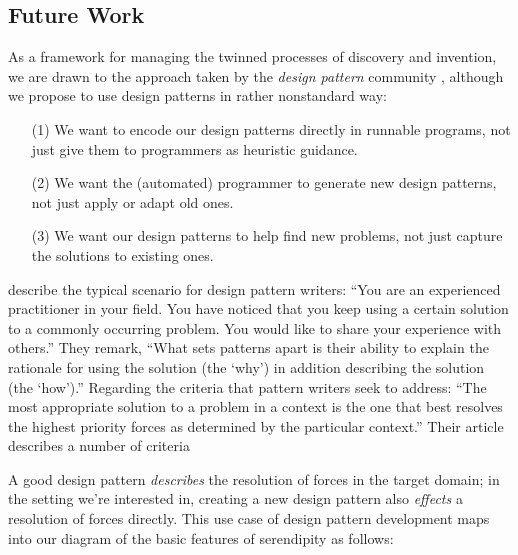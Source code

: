 \subsection{Future Work} \label{sec:futurework} \label{sec:hatching}

As a framework for managing the twinned processes of discovery and invention,
we are drawn to the approach taken by the \emph{design pattern}
community \cite{alexander1999origins}, although we propose to use
design patterns in rather nonstandard way:
\begin{itemize}
\item[(1)] We want to encode our design patterns directly in runnable
  programs, not just give them to programmers as heuristic guidance.
\item[(2)] We want the (automated) programmer to generate new design
  patterns, not just apply or adapt old ones.
\item[(3)] We want our design patterns to help find new problems,
  not just capture the solutions to existing ones.
\end{itemize}

 describe the typical scenario for design
pattern writers: ``You are an experienced practitioner in your
field. You have noticed that you keep using a certain solution to a
commonly occurring problem. You would like to share your experience
with others.''  They remark, ``What sets patterns apart is their
ability to explain the rationale for using the solution (the `why') in
addition describing the solution (the `how').''  Regarding the
criteria that pattern writers seek to address: ``The most appropriate
solution to a problem in a context is the one that best resolves the
highest priority forces as determined by the particular context.''  %
Their article describes a number of criteria

A good design pattern \emph{describes} the resolution of forces in the
target domain; in the setting we're interested in, creating a new
design pattern also \emph{effects} a resolution of forces directly.
This use case of design pattern development maps into our diagram of
the basic features of serendipity as follows:



